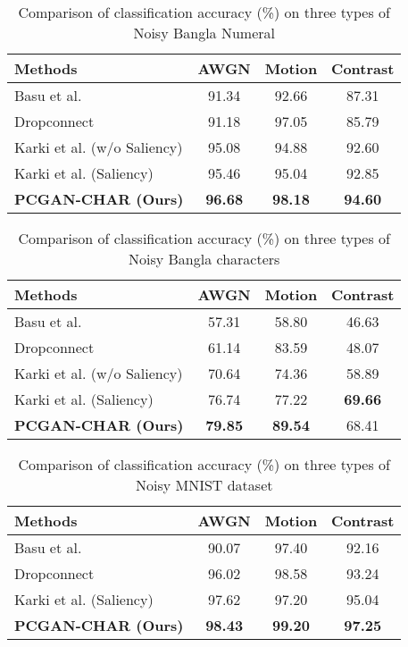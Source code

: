 \documentclass[runningheads]{llncs}
\begin{document}
\begin {table}[b!]
\caption {Comparison of classification accuracy (\%) on three types of Noisy Bangla Numeral}
\begin{center}
\begin{tabular}{ p{4.5cm}|c|c|c }
 \hline
 Methods & AWGN & Motion & Contrast\\
 \hline
 Basu et al. \cite{basu2017learning} & 91.34 & 92.66 & 87.31 \\
 Dropconnect \cite{Karki18}  & 91.18 & 97.05 & 85.79 \\
 Karki et al. (w/o Saliency) \cite{Karki18}  & 95.08 & 94.88 & 92.60 \\
 Karki et al. (Saliency) \cite{Karki18}  & 95.46 & 95.04 & 92.85 \\
 \textbf{PCGAN-CHAR (Ours)} & \textbf{96.68} & \textbf{98.18} & \textbf{94.60} \\
 \hline
\end{tabular}
\label{tb_accu_numeral}
\end{center}
\end{table}

\begin {table}[b!]
\caption {Comparison of classification accuracy (\%) on three types of Noisy Bangla characters}
\begin{center}
\begin{tabular}{ p{4.5cm}|c|c|c }
 \hline
 Methods & AWGN & Motion & Contrast\\
 \hline
 Basu et al. \cite{basu2017learning} & 57.31 & 58.80 & 46.63 \\
 Dropconnect \cite{Karki18}  & 61.14 & 83.59 & 48.07 \\
 Karki et al. (w/o Saliency) \cite{Karki18}  & 70.64 & 74.36 & 58.89 \\
 Karki et al. (Saliency) \cite{Karki18}  & 76.74 & 77.22 & \textbf{69.66} \\
 \textbf{PCGAN-CHAR (Ours)} & \textbf{79.85} & \textbf{89.54} & 68.41 \\
 \hline
\end{tabular}
\label{tb_accu_characters}
\end{center}
\end{table}

\begin {table}[b!]
\caption {Comparison of classification accuracy (\%) on three types of Noisy MNIST dataset}
\begin{center}
\begin{tabular}{ p{4.5cm}|c|c|c}
 \hline
 Methods & AWGN & Motion & Contrast\\
 \hline
 Basu et al. \cite{basu2017learning} & 90.07 & 97.40 & 92.16 \\
 Dropconnect \cite{Karki18}  & 96.02 & 98.58 & 93.24 \\
 Karki et al. (Saliency) \cite{Karki18}  & 97.62 & 97.20 & 95.04 \\
 \textbf{PCGAN-CHAR (Ours)} & \textbf{98.43} & \textbf{99.20} & \textbf{97.25} \\
 \hline
\end{tabular}
\label{tb_accu_mnist}
\end{center}
\end{table}
\end{document}
